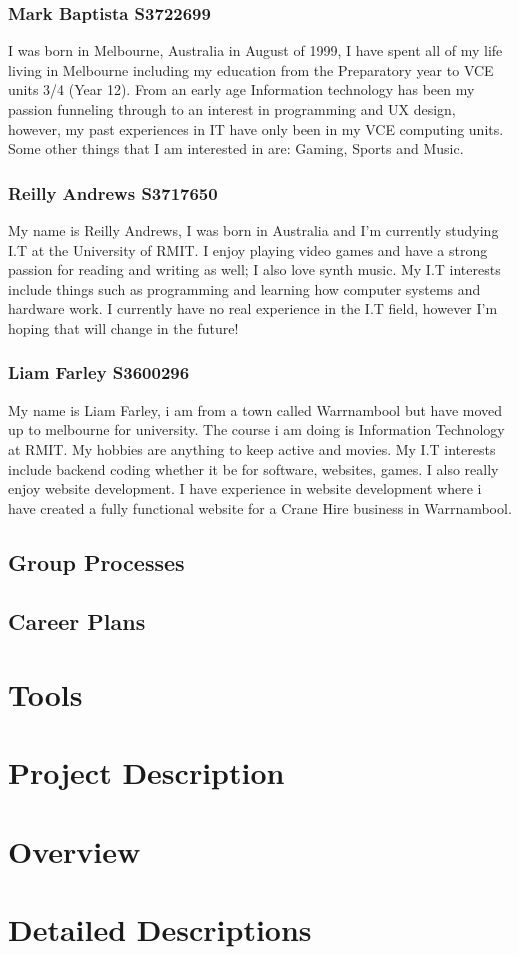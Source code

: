 \documentclass[10pt,a4paper]{article}
\begin{document}
\subsubsection{Mark Baptista \textbar\hspace{0.4mm}S3722699}
I was born in Melbourne, Australia in August of 1999, I have spent all of my life living in Melbourne including my education from the Preparatory year to VCE units 3/4 (Year 12). From an early age Information technology has been my passion funneling through to an interest in programming and UX design, however, my past experiences in IT have only been in my VCE computing units. Some other things that I am interested in are: Gaming, Sports and Music.
\subsubsection{Reilly Andrews \textbar\hspace{0.4mm}S3717650}
My name is Reilly Andrews, I was born in Australia and I’m currently studying I.T at the University of RMIT. I enjoy playing video games and have a strong passion for reading and writing as well; I also love synth music. My I.T interests include things such as programming and learning how computer systems and hardware work. I currently have no real experience in the I.T field, however I’m hoping that will change in the future!
\subsubsection{Liam Farley \textbar\hspace{0.4mm}S3600296 }	
My name is Liam Farley, i am from a town called Warrnambool but have moved up to melbourne for university. The course i am doing is Information Technology at RMIT. My hobbies are anything to keep active and movies. My I.T interests include backend coding whether it be for software, websites, games. I also really enjoy website development. I have experience in website development where i have created a fully functional website for a Crane Hire business in Warrnambool. 
\subsection{Group Processes}
\subsection{Career Plans}
\section{Tools}
\section{Project Description}
\section{Overview}
\section{Detailed Descriptions}
\end{document}
